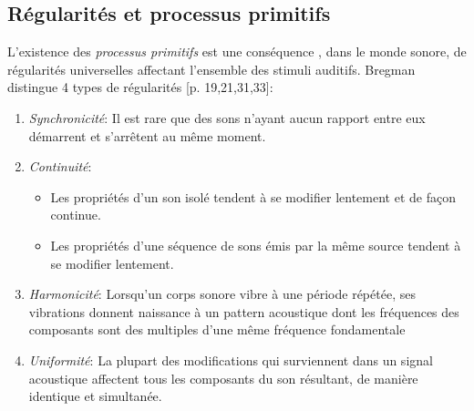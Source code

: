\subsection{Régularités et processus primitifs}

L'existence des \emph{processus primitifs} est une conséquence  , dans le monde sonore, de régularités universelles affectant l'ensemble des stimuli auditifs. Bregman distingue 4 types de régularités [p. 19,21,31,33]\citep{mcadams1994penser}:

\begin{enumerate}
\item \emph{Synchronicité}: Il est rare que des sons n'ayant aucun rapport entre eux démarrent et s'arrêtent au même moment.
\item \emph{Continuité}: 
\begin{itemize}
\item Les propriétés d'un son isolé tendent à se modifier lentement et de façon continue.
\item Les propriétés d'une séquence de sons émis par la même source tendent à se modifier lentement.
\end{itemize}
\item \emph{Harmonicité}: Lorsqu'un corps sonore vibre à une période répétée, ses vibrations donnent naissance à un pattern acoustique dont les fréquences des composants sont des multiples d'une même fréquence fondamentale
\item \emph{Uniformité}: La plupart des modifications qui surviennent dans un signal acoustique affectent tous les composants du son résultant, de manière identique et simultanée.
\end{enumerate}

 

